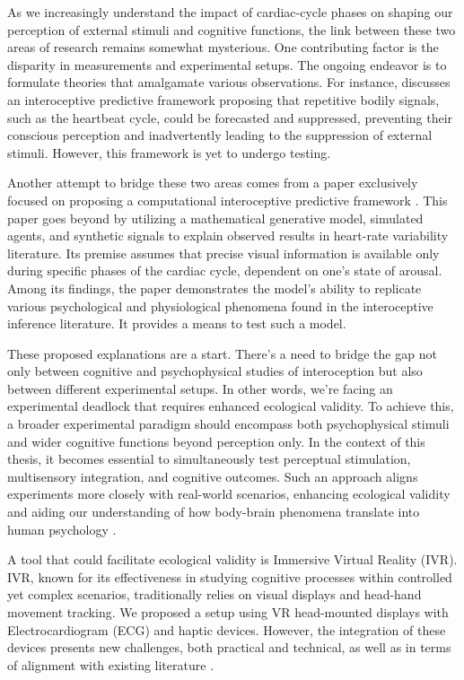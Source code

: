 \documentclass[12pt,oneside,openright]{report}
\begin{document}
As we increasingly understand the impact of cardiac-cycle phases on shaping our perception of external stimuli and cognitive functions, the link between these two areas of research remains somewhat mysterious. One contributing factor is the disparity in measurements and experimental setups. The ongoing endeavor is to formulate theories that amalgamate various observations. For instance, \parencite{AL2021118247} discusses an interoceptive predictive framework proposing that repetitive bodily signals, such as the heartbeat cycle, could be forecasted and suppressed, preventing their conscious perception and inadvertently leading to the suppression of external stimuli. However, this framework is yet to undergo testing.

Another attempt to bridge these two areas comes from a paper exclusively focused on proposing a computational interoceptive predictive framework \parencite{Allen2022}. This paper goes beyond by utilizing a mathematical generative model, simulated agents, and synthetic signals to explain observed results in heart-rate variability literature. Its premise assumes that precise visual information is available only during specific phases of the cardiac cycle, dependent on one's state of arousal. Among its findings, the paper demonstrates the model's ability to replicate various psychological and physiological phenomena found in the interoceptive inference literature. It provides a means to test such a model.
 
These proposed explanations are a start. There's a need to bridge the gap not only between cognitive and psychophysical studies of interoception but also between different experimental setups. In other words, we're facing an experimental deadlock that requires enhanced ecological validity. To achieve this, a broader experimental paradigm should encompass both psychophysical stimuli and wider cognitive functions beyond perception only. In the context of this thesis, it becomes essential to simultaneously test perceptual stimulation, multisensory integration, and cognitive outcomes. Such an approach aligns experiments more closely with real-world scenarios, enhancing ecological validity and aiding our understanding of how body-brain phenomena translate into human psychology \parencite{schmuckler2001ecological}.

A tool that could facilitate ecological validity is Immersive Virtual Reality (IVR). IVR, known for its effectiveness in studying cognitive processes within controlled yet complex scenarios, traditionally relies on visual displays and head-hand movement tracking. We proposed a setup using VR head-mounted displays with Electrocardiogram (ECG) and haptic devices. However, the integration of these devices presents new challenges, both practical and technical, as well as in terms of alignment with existing literature \parencite{Klotzsche2023}.
\end{document}
